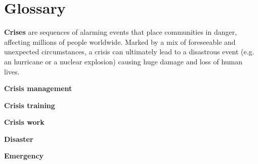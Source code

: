 \chapter{Glossary} \label{glossary}

\textbf{Crises} are sequences of alarming events that place communities in danger, affecting millions of people worldwide. Marked by a mix of foreseeable and unexpected circumstances, a crisis can ultimately lead to a disastrous event (e.g. an hurricane or a nuclear explosion) causing huge damage and loss of human lives.

\textbf{Crisis management}

\textbf{Crisis training}

\textbf{Crisis work}

\textbf{Disaster}

\textbf{Emergency}